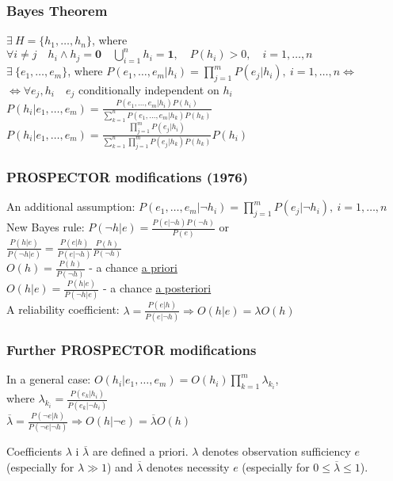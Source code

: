 \documentclass[proffesionalfonts]{beamer}
\newcommand{\un}[1]{\underline{#1}}
\begin{document}
\begin{frame}\frametitle{Bayes Theorem}
\begin{center}
\normalsize
$\exists\ H=\{h_1,\ldots,h_n\}$, where $\forall i\ne j\quad h_i\land h_j=\mathbf{0}\quad\displaystyle\bigcup_{i=1}^{n}h_i=\mathbf{1},\quad P(h_i)>0,\quad i=1,\ldots,n$\\
$\exists\ \{e_1,\ldots,e_m\}$, where $\displaystyle P(e_1,\ldots,e_m|h_i)=\prod_{j=1}^m P(e_j|h_i),\ i=1,\ldots,n\Leftrightarrow$\\
$\Leftrightarrow\forall e_j,h_i\quad e_j$ conditionally independent on $h_i$\\[3mm]
\large
$P(h_i|e_1,\ldots,e_m)=\frac{\displaystyle P(e_1,\ldots,e_m|h_i)P(h_i)}{\displaystyle\sum_{k=1}^{n}P(e_1,\ldots,e_m|h_k)P(h_k)}$\\
$P(h_i|e_1,\ldots,e_m)=\frac{\displaystyle\prod_{j=1}^m P(e_j|h_i)}{\displaystyle\sum_{k=1}^n \prod_{j=1}^m P(e_j|h_k)P(h_k)}P(h_i)$
\normalsize
\end{center}
\end{frame}

\begin{frame}\frametitle{PROSPECTOR modifications (1976)}
\begin{center}
\large
An additional assumption: $\displaystyle P(e_1,\ldots,e_m|\neg h_i)=\prod_{j=1}^m P(e_j|\neg h_i),\ i=1,\ldots,n$\\
New Bayes rule: $\displaystyle P(\neg h|e)=\frac{P(e|\neg h)P(\neg h)}{P(e)}$ or\\[1mm]
$\displaystyle \frac{P(h|e)}{P(\neg h|e)}=\frac{P(e|h)}{P(e|\neg h)}\frac{P(h)}{P(\neg h)}$\\[1mm]
$\displaystyle O(h)=\frac{P(h)}{P(\neg h)}$ - a chance \un{a priori}\\[1mm]
$\displaystyle O(h|e)=\frac{P(h|e)}{P(\neg h|e)}$ - a chance \un{a posteriori}\\[1mm]
A reliability coefficient: $\displaystyle \lambda=\frac{P(e|h)}{P(e|\neg h)}\Rightarrow O(h|e)=\lambda O(h)$
\normalsize
\end{center}
\end{frame}

\begin{frame}\frametitle{Further PROSPECTOR modifications}
\begin{center}
\large
In a general case: $\displaystyle O(h_i|e_1,\ldots,e_m)=O(h_i)\prod_{k=1}^m\lambda_{k_i}$,\\
where $\displaystyle \lambda_{k_i}=\frac{P(e_k|h_i)}{P(e_k|\neg h_i)}$ \\[8mm]
$\displaystyle \overline{\lambda}=\frac{P(\neg e|h)}{P(\neg e|\neg h)}\Rightarrow O(h|\neg e)=\overline{\lambda}O(h)$\\[2mm]
\parbox[b]{115mm}{
Coefficients $\lambda$ i $\overline{\lambda}$ are defined a priori. $\lambda$ denotes observation sufficiency $e$ (especially for $\lambda\gg 1$) and $\overline{\lambda}$ denotes necessity $e$ (especially for $0\le\overline{\lambda}\le 1$).
}
\normalsize
\end{center}
\end{frame}
\end{document}
